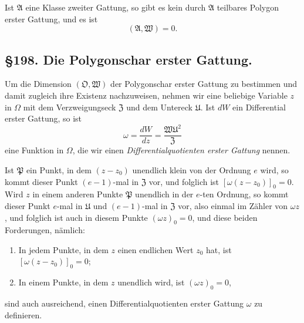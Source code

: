 \documentclass[12pt,a4paper]{article}
\begin{document}
Ist $\mathfrak{A}$ eine Klasse zweiter Gattung, so gibt es kein durch $\mathfrak{A}$ teilbares Polygon erster Gattung, und es ist
\[
(\mathfrak{A}, \mathfrak{W}) = 0.
\]

\subsection*{\S 198. Die Polygonschar erster Gattung.}

Um die Dimension $(\mathfrak{O}, \mathfrak{W})$ der Polygonschar erster Gattung zu bestimmen und damit zugleich ihre Existenz nachzuweisen, nehmen wir eine beliebige Variable $z$ in $\Omega$ mit dem Verzweigungseck $\mathfrak{Z}$ und dem Untereck $\mathfrak{U}$. Ist $dW$ ein Differential erster Gattung, so ist
\begin{equation}\label{eq:198-1}
\omega = \frac{dW}{dz} = \frac{\mathfrak{W}\mathfrak{U}^2}{\mathfrak{Z}}
\end{equation}
eine Funktion in $\Omega$, die wir einen \emph{Differentialquotienten erster Gattung} nennen.

Ist $\mathfrak{P}$ ein Punkt, in dem $(z - z_0)$ unendlich klein von der Ordnung $e$ wird, so kommt dieser Punkt $(e-1)$-mal in $\mathfrak{Z}$ vor, und folglich ist $[\omega(z - z_0)]_0 = 0$. Wird $z$ in einem anderen Punkte $\mathfrak{P}$ unendlich in der $e$-ten Ordnung, so kommt dieser Punkt $e$-mal in $\mathfrak{U}$ und $(e-1)$-mal in $\mathfrak{Z}$ vor, also einmal im Zähler von $\omega z$, und folglich ist auch in diesem Punkte $(\omega z)_0 = 0$, und diese beiden Forderungen, nämlich:
\begin{enumerate}
\item[a)] In jedem Punkte, in dem $z$ einen endlichen Wert $z_0$ hat, ist $[\omega(z - z_0)]_0 = 0$;
\item[b)] In einem Punkte, in dem $z$ unendlich wird, ist $(\omega z)_0 = 0$,
\end{enumerate}
sind auch ausreichend, einen Differentialquotienten erster Gattung $\omega$ zu definieren.
\end{document}
